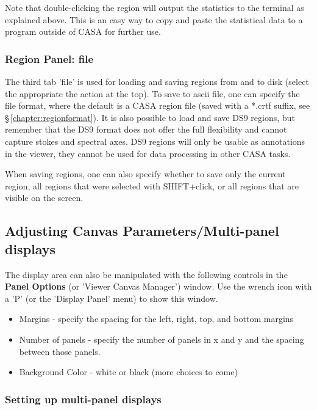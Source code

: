 Note that double-clicking the region will output the 
statistics to the terminal as explained above. This is an easy way to
copy and paste the statistical data to a program outside of CASA for
further use. 


\subsubsection{Region Panel: file}
\label{section:display.image.rgnmgr.file}

The third tab 'file' is used for loading and saving regions from and
to disk (select the appropriate the action at the top). To save to
ascii file, one can specify the file format, where the default is a
CASA region file (saved with a *.crtf suffix, see
\S\,\ref{chapter:regionformat}). It is also possible to load and save
DS9 regions, but remember that the DS9 format does not offer the full
flexibility and cannot capture stokes and spectral axes. DS9 regions
will only be usable as annotations in the viewer, they cannot be used
for data processing in other CASA tasks.

When saving regions, one can also specify whether to save only the
current region, all regions that were selected with
SHIFT+click, or all regions that are visible on the screen. 


\subsection{Adjusting Canvas Parameters/Multi-panel displays}
\label{section:display.viewerGUI.canvas}

The display area can also be manipulated with the following controls in
the {\bf Panel Options} (or 'Viewer Canvas Manager') window.
Use the wrench icon with a 'P' (or the 'Display Panel' menu) to show this
window.
\begin{itemize}
   \item Margins - specify the spacing for the left, right, top, and bottom margins
   \item Number of panels - specify the number of panels in x and y
         and the spacing between those panels.
   \item Background Color - white or black (more choices to come)
\end{itemize}

\subsubsection{Setting up multi-panel displays}
\label{section:display.viewerGUI.canvas.multi}

